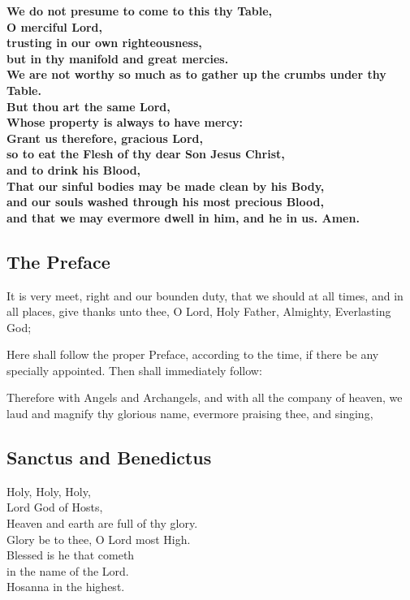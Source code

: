 
\textbf{We do not presume to come to this thy Table,\\
O merciful Lord,\\
trusting in our own righteousness,\\
but in thy manifold and great mercies.\\
We are not worthy so much as to gather up the crumbs under thy Table.\\
But thou art the same Lord,\\
Whose property is always to have mercy:\\
Grant us therefore, gracious Lord,\\
so to eat the Flesh of thy dear Son Jesus Christ,\\
and to drink his Blood,\\
That our sinful bodies may be made clean by his Body,\\
and our souls washed through his most precious Blood,\\
and that we may evermore dwell in him, and he in us. Amen.}

\subsection{The Preface}


It is very meet, right and our bounden duty, that we should at all times, and in
all places, give thanks unto thee, O Lord, Holy Father, Almighty, Everlasting God;

\begin{rubric}
Here shall follow the proper Preface, according to the time, if there be any specially appointed.
Then shall immediately follow:
\end{rubric}

Therefore with Angels and Archangels, and with all the company of heaven,
we laud and magnify thy glorious name, evermore praising thee, and singing,

\subsection{Sanctus and Benedictus}

Holy, Holy, Holy,\\
Lord God of Hosts,\\
Heaven and earth are full of thy glory.\\
Glory be to thee, O Lord most High.\\
\cross Blessed is he that cometh\\
in the name of the Lord.\\
Hosanna in the highest.

